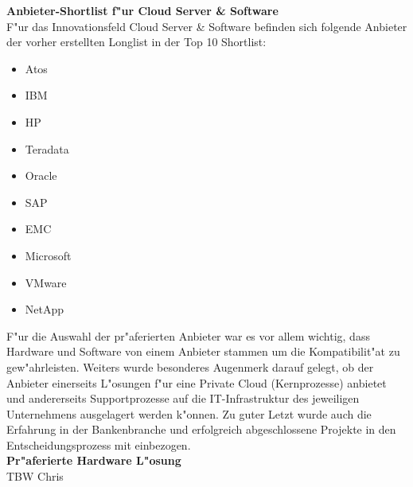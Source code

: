 \textbf{Anbieter-Shortlist f"ur Cloud Server \& Software}\\
F"ur das Innovationsfeld Cloud Server \& Software befinden sich folgende Anbieter der vorher erstellten Longlist in der Top 10 Shortlist:

\begin{itemize}
	\item Atos
	\item IBM
	\item HP
	\item Teradata
	\item Oracle
	\item SAP
	\item EMC
	\item Microsoft
	\item VMware
	\item NetApp
\end{itemize}

F"ur die Auswahl der pr"aferierten Anbieter war es vor allem wichtig, dass Hardware und Software von einem Anbieter stammen um die Kompatibilit"at zu gew"ahrleisten. Weiters wurde besonderes Augenmerk darauf gelegt, ob der Anbieter einerseits L"osungen f"ur eine Private Cloud (Kernprozesse) anbietet und andererseits Supportprozesse auf die IT-Infrastruktur des jeweiligen Unternehmens ausgelagert werden k"onnen. Zu guter Letzt wurde auch die Erfahrung in der Bankenbranche und erfolgreich abgeschlossene Projekte in den Entscheidungsprozess mit einbezogen.\\

\textbf{Pr"aferierte Hardware L"osung}\\
TBW Chris\\